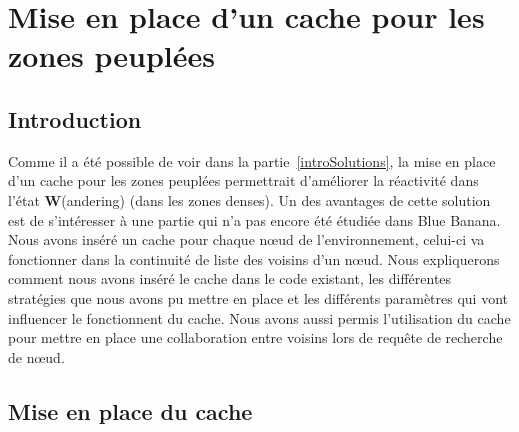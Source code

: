\section{Mise en place d'un cache pour les zones peuplées}
\subsection{Introduction}
Comme il a été possible de voir dans la partie~\ref{introSolutions}, la mise en place d'un cache pour les zones peuplées permettrait d'améliorer la réactivité dans l'état \textbf{W}(andering) (dans les zones denses). Un des avantages de cette solution est de s'intéresser à une partie qui n'a pas encore été étudiée dans Blue Banana. Nous avons inséré un cache pour chaque nœud de l'environnement, celui-ci va fonctionner dans la continuité de liste des voisins d'un nœud. Nous expliquerons comment nous avons inséré le cache dans le code existant, les différentes stratégies que nous avons pu mettre en place et les différents paramètres qui vont influencer le fonctionnent du cache. Nous avons aussi permis l'utilisation du cache pour mettre en place une collaboration entre voisins lors de requête de recherche de nœud.
 
\subsection{Mise en place du cache}

